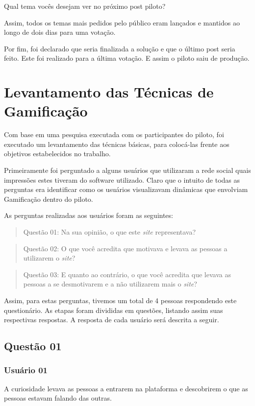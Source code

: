 Qual tema vocês desejam ver no próximo post piloto?

Assim, todos os temas mais pedidos pelo público eram lançados e mantidos ao longo de dois dias para uma votação.

Por fim, foi declarado que seria finalizada a solução e que o último post seria feito. Este foi realizado para a
última votação. E assim o piloto saiu de produção.

\section{Levantamento das Técnicas de Gamificação}
\label{sec:implementacao_levantamento}
Com base em uma pesquisa executada com os participantes do piloto, foi executado um levantamento das
técnicas básicas, para colocá-las frente aos objetivos estabelecidos no trabalho.

Primeiramente foi perguntado a alguns usuários que utilizaram a rede social quais impressões estes tiveram
do software utilizado.
Claro que o intuito de todas as perguntas era identificar como os usuários visualizavam dinâmicas
que envolviam Gamificação dentro do piloto.

As perguntas realizadas aos usuários foram as seguintes:

\begin{quotation}
    Questão 01: Na sua opinião, o que este \textit{site} representava?
\end{quotation}

\begin{quotation}
    Questão 02: O que você acredita que motivava e levava as pessoas a utilizarem o \textit{site}?
\end{quotation}

\begin{quotation}
    Questão 03: E quanto ao contrário, o que você acredita que levava as pessoas a se desmotivarem e a não
    utilizarem mais o \textit{site}?
\end{quotation}

Assim, para estas perguntas, tivemos um total de 4 pessoas respondendo este questionário.
As etapas foram divididas em questões, listando assim suas respectivas respostas. 
A resposta de cada usuário será descrita a seguir.

\subsection{Questão 01}
\subsubsection{Usuário 01}
A curiosidade levava as pessoas a entrarem na plataforma e descobrirem o que as
pessoas estavam falando das outras.
